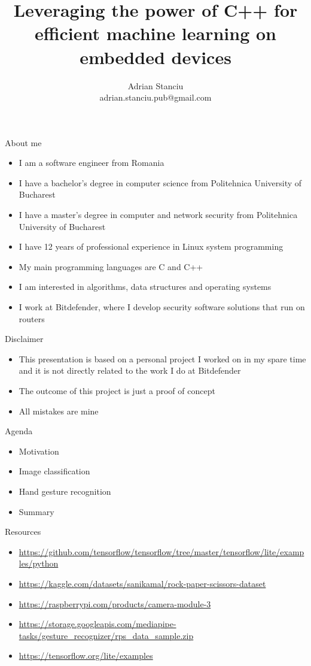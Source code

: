 \documentclass{beamer}
\title{Leveraging the power of C++ for efficient machine learning on embedded
devices}
\subtitle{}
\author{Adrian Stanciu\\{\small adrian.stanciu.pub@gmail.com}}
\date{}
\institute{NDC TechTown, 2023}
\begin{document}
\frame{\titlepage}

\begin{frame}{About me}
  \begin{itemize}
	\item I am a software engineer from Romania
	\item I have a bachelor's degree in computer science from Politehnica
	University of Bucharest
	\item I have a master's degree in computer and network security from
	Politehnica University of Bucharest
	\item I have 12 years of professional experience in Linux system
	programming
	\item My main programming languages are C and C++
	\item I am interested in algorithms, data structures and operating systems
	\item I work at Bitdefender, where I develop security software solutions
	that run on routers
  \end{itemize}
\end{frame}

\begin{frame}{Disclaimer}
  \begin{itemize}
	\item This presentation is based on a personal project I worked on in my
	spare time and it is not directly related to the work I do at Bitdefender
	\item The outcome of this project is just a proof of concept
	\item All mistakes are mine
  \end{itemize}
\end{frame}

\begin{frame}{Agenda}
  \begin{itemize}
	\item Motivation
	\item Image classification
	\item Hand gesture recognition
	\item Summary
  \end{itemize}
\end{frame}






\begin{frame}{Resources}
  \begin{itemize}
	\item \url{https://github.com/tensorflow/tensorflow/tree/master/tensorflow/lite/examples/python}
	\item \url{https://kaggle.com/datasets/sanikamal/rock-paper-scissors-dataset}
	\item \url{https://raspberrypi.com/products/camera-module-3}
	\item \url{https://storage.googleapis.com/mediapipe-tasks/gesture_recognizer/rps_data_sample.zip}
	\item \url{https://tensorflow.org/lite/examples}
  \end{itemize}
\end{frame}
\end{document}
